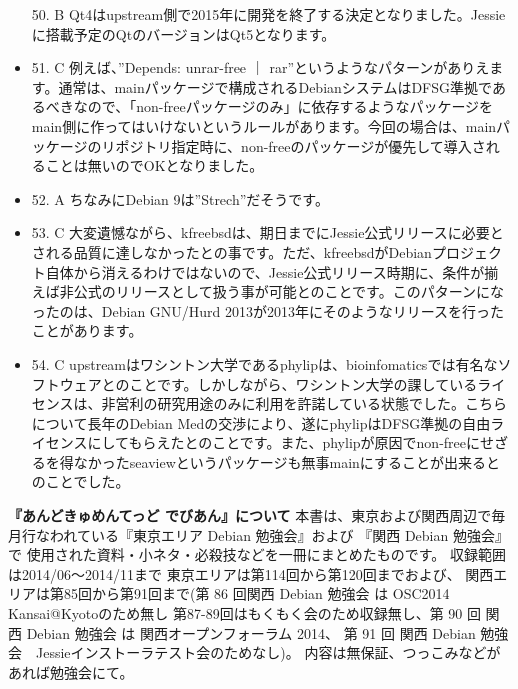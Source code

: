 \documentclass[mingoth,a4paper]{jsarticle}
\begin{document}
\begin{itemize}
50. B Qt4はupstream側で2015年に開発を終了する決定となりました。Jessieに搭載予定のQtのバージョンはQt5となります。
\item
51. C 例えば、''Depends: unrar-free ｜ rar''というようなパターンがありえます。通常は、mainパッケージで構成されるDebianシステムはDFSG準拠であるべきなので、「non-freeパッケージのみ」に依存するようなパッケージをmain側に作ってはいけないというルールがあります。今回の場合は、mainパッケージのリポジトリ指定時に、non-freeのパッケージが優先して導入されることは無いのでOKとなりました。
\item
52. A ちなみにDebian 9は''Strech''だそうです。
\item
53. C 大変遺憾ながら、kfreebsdは、期日までにJessie公式リリースに必要とされる品質に達しなかったとの事です。ただ、kfreebsdがDebianプロジェクト自体から消えるわけではないので、Jessie公式リリース時期に、条件が揃えば非公式のリリースとして扱う事が可能とのことです。このパターンになったのは、Debian GNU/Hurd 2013が2013年にそのようなリリースを行ったことがあります。
\item
54. C upstreamはワシントン大学であるphylipは、bioinfomaticsでは有名なソフトウェアとのことです。しかしながら、ワシントン大学の課しているライセンスは、非営利の研究用途のみに利用を許諾している状態でした。こちらについて長年のDebian Medの交渉により、遂にphylipはDFSG準拠の自由ライセンスにしてもらえたとのことです。また、phylipが原因でnon-freeにせざるを得なかったseaviewというパッケージも無事mainにすることが出来るとのことでした。
\end{itemize}

\newpage
\thispagestyle{empty}\mbox{}

\newpage

\thispagestyle{empty}
{
\large
\begin{itembox}{\bf 『あんどきゅめんてっど でびあん』について}
本書は、東京および関西周辺で毎月行なわれている『東京エリア Debian 勉強会』および
『関西 Debian 勉強会』で
使用された資料・小ネタ・必殺技などを一冊にまとめたものです。
収録範囲は2014/06〜2014/11まで
東京エリアは第114回から第120回までおよび、
関西エリアは第85回から第91回まで(第 86 回関西 Debian 勉強会 は OSC2014 Kansai@Kyotoのため無し
第87-89回はもくもく会のため収録無し、第 90 回 関西 Debian 勉強会 は 関西オープンフォーラム 2014、
第 91 回 関西 Debian 勉強会　Jessieインストーラテスト会のためなし)。
内容は無保証、つっこみなどがあれば勉強会にて。
\end{itembox}
}
\end{document}
